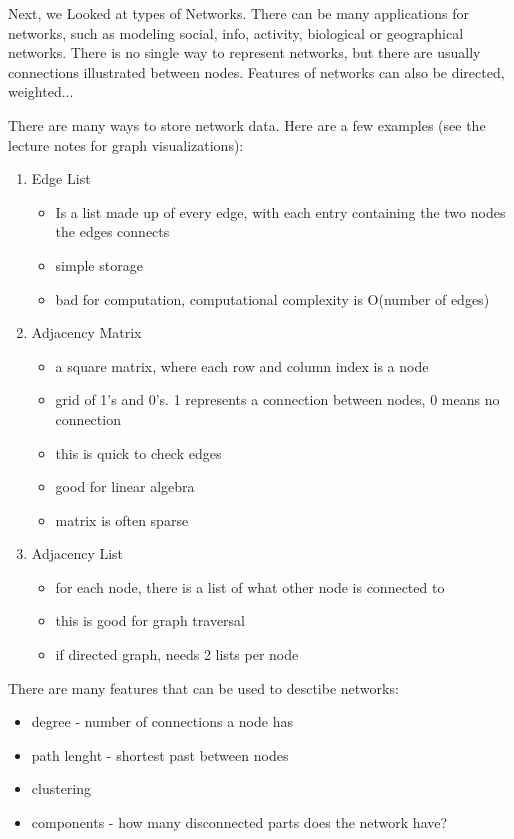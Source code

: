 Next, we Looked at types of Networks. There can be many applications for networks, such as modeling social, info, activity, biological or geographical networks. There is no single way to represent networks, but there are usually connections illustrated between nodes. Features of networks can also be directed, weighted...

There are many ways to store network data. Here are a few examples (see the lecture notes for graph visualizations):
\begin{enumerate}
  \item Edge List \\
    \begin{itemize}
      \item Is a list made up of every edge, with each entry containing the two nodes the edges connects
      \item simple storage
      \item bad for computation, computational complexity is O(number of edges)
    \end{itemize}
  \item Adjacency Matrix
    \begin{itemize}
       \item a square matrix, where each row and column index is a node
       \item grid of 1's and 0's. 1 represents a connection between nodes, 0 means no connection
       \item this is quick to check edges
       \item good for linear algebra
       \item matrix is often sparse
      \end{itemize}
  \item Adjacency List
   \begin{itemize}
        \item for each node, there is a list of what other node is connected to
        \item this is good for graph traversal
        \item if directed graph, needs 2 lists per node
      \end{itemize}
\end{enumerate}


There are many features that can be used to desctibe networks:
\begin{itemize}
  \item degree - number of connections a node has
  \item path lenght - shortest past between nodes
  \item clustering
  \item components - how many disconnected parts does the network have?
\end{itemize}











